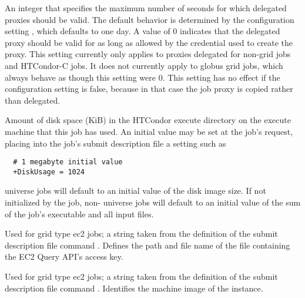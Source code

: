 \begin{description}
\item[\AdAttr{DelegateJobGSICredentialsLifetime}:]   
An integer that specifies the maximum number of seconds for which
delegated proxies should be valid.  The default behavior is determined
by the configuration
setting , which
defaults to one day.  A value of 0 indicates that the delegated proxy
should be valid for as long as allowed by the credential used to
create the proxy.  This setting currently only applies to proxies
delegated for non-grid jobs and HTCondor-C jobs.  It does not currently
apply to globus grid jobs, which always behave as though this setting
were 0.  This setting has no effect if the configuration
setting  is false, because in
that case the job proxy is copied rather than delegated.

\item[\AdAttr{DiskUsage}:] Amount of disk space (KiB) in the HTCondor
execute directory on the execute machine that this job has used.
An initial value may be set at the job's request, placing into the
job's submit description file a setting such as
\begin{verbatim}
  # 1 megabyte initial value
  +DiskUsage = 1024
\end{verbatim}
 universe jobs will default to an initial value of the disk
image size. 
If not initialized by the job,
non- universe jobs will default to an initial value of the 
sum of the job's executable and all input files.

\item[\AdAttr{EC2AccessKeyId}:] 
Used for grid type ec2 jobs;
a string taken from the definition of the submit description file command
.
Defines the path and file name of the file containing the EC2 Query API's
access key.

\item[\AdAttr{EC2AmiID}:] 
Used for grid type ec2 jobs;
a string taken from the definition of the submit description file command
.
Identifies the machine image of the instance.


\end{description}
